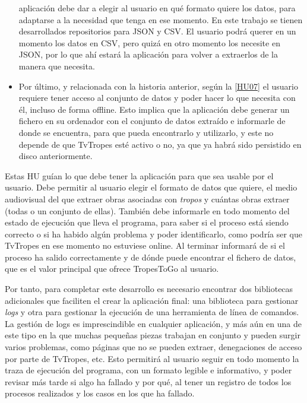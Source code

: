 \begin{itemize}
    aplicación debe dar a elegir al usuario en qué formato quiere los datos,
    para adaptarse a la necesidad que tenga en ese momento. En este trabajo se
    tienen desarrollados repositorios para JSON y CSV. El usuario podrá querer
    en un momento los datos en CSV, pero quizá en otro momento los necesite en
    JSON, por lo que ahí estará la aplicación para volver a extraerlos de la
    manera que necesita.
    \item Por último, y relacionada con la historia anterior, según la
    \href{https://github.com/jlgallego99/TropesToGo/issues/46}{[HU07]} el
    usuario requiere tener acceso al conjunto de datos y poder hacer lo que
    necesita con él, incluso de forma offline. Esto implica que la aplicación
    debe generar un fichero en su ordenador con el conjunto de datos extraído e
    informarle de donde se encuentra, para que pueda encontrarlo y utilizarlo, y
    este no depende de que TvTropes esté activo o no, ya que ya habrá sido
    persistido en disco anteriormente.
\end{itemize}

Estas HU guían lo que debe tener la aplicación para que sea usable por el
usuario. Debe permitir al usuario elegir el formato de datos que quiere, el
medio audiovisual del que extraer obras asociadas con \textit{tropos} y cuántas
obras extraer (todas o un conjunto de ellas). También debe informarle en todo
momento del estado de ejecución que lleva el programa, para saber si el proceso
está siendo correcto o si ha habido algún problema y poder identificarlo, como
podría ser que TvTropes en ese momento no estuviese online. Al terminar
informará de si el proceso ha salido correctamente y de dónde puede encontrar el
fichero de datos, que es el valor principal que ofrece TropesToGo al usuario.

Por tanto, para completar este desarrollo es necesario encontrar dos bibliotecas
adicionales que faciliten el crear la aplicación final: una biblioteca para
gestionar \textit{logs} y otra para gestionar la ejecución de una herramienta de
línea de comandos. La gestión de logs es imprescindible en cualquier aplicación,
y más aún en una de este tipo en la que muchas pequeñas piezas trabajan en
conjunto y pueden surgir varios problemas, como páginas que no se pueden
extraer, denegaciones de acceso por parte de TvTropes, etc. Esto permitirá al
usuario seguir en todo momento la traza de ejecución del programa, con un
formato legible e informativo, y poder revisar más tarde si algo ha fallado y
por qué, al tener un registro de todos los procesos realizados y los casos en
los que ha fallado. 


